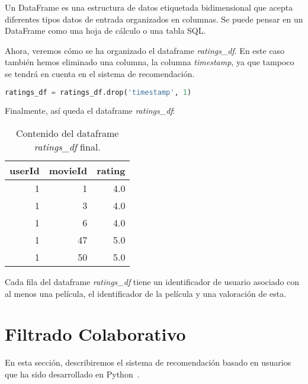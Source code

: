 \documentclass{uimppracticas}
\begin{document}
\begin{definition}\label{dataframe}
	Un DataFrame es una estructura de datos etiquetada bidimensional que acepta diferentes tipos datos de entrada organizados en columnas. Se puede pensar en un DataFrame como una hoja de cálculo o una tabla SQL.
\end{definition}

Ahora, veremos cómo se ha organizado el dataframe \textit{ratings\_df}. En este caso también hemos eliminado una columna, la columna \textit{timestamp}, ya que tampoco se tendrá en cuenta en el sistema de recomendación.

\begin{lstlisting}[language=python]
ratings_df = ratings_df.drop('timestamp', 1)
\end{lstlisting}

Finalmente, así queda el dataframe \textit{ratings\_df}:

\begin{table}[h]
	\centering
	\begin{tabular}{rrr}
		\toprule
		userId &  movieId &  rating \\
		\midrule
		1 &        1 &     4.0 \\
		1 &        3 &     4.0 \\
		1 &        6 &     4.0 \\
		1 &       47 &     5.0 \\
		1 &       50 &     5.0 \\
		\bottomrule
	\end{tabular}
	\caption{Contenido del dataframe \textit{ratings\_df} final.}
	\label{ratings_df_final}
\end{table}


Cada fila del dataframe \textit{ratings\_df} tiene un identificador de usuario asociado con al menos una película, el identificador de la película y una valoración de esta. 

\newpage

\section{Filtrado Colaborativo}

En esta sección, describiremos el sistema de recomendación basado en usuarios que ha sido desarrollado en Python~\cite{GitHubRepo}.
\end{document}

